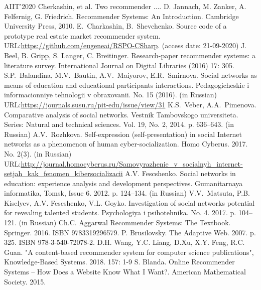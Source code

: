 \documentclass[conference,a4]{IEEEtran}
\begin{document}
\begin{thebibliography}{99}

 AIIT'2020 Cherkashin, et al. Two recommender ....
 D. Jannach, M. Zanker, A. Felfernig, G. Friedrich. Recommender Systems: An Introduction. Cambridge University Press, 2010.
E.~Charkashin, B.~Shevchenko. Source code of a prototype real estate market recommender system.  URL:\url{https://github.com/eugeneai/RSPO-CSharp}. (access date: 21-09-2020)
 J. Beel, B. Gripp, S. Langer, C. Breitinger. Research-paper recommender systems: a literature survey. International Journal on Digital Libraries (2016) 17: 305. 
S.P.~Balandina, M.V.~Bautin, A.V.~Maiyorov, E.R.~Smirnova. Social networks as means of education and educational participants interactions. Pedagogicheskie i informacionniye tehnologii v obraxovanii. No. 15 (2016). (in Russian) URL:\url{https://journals.susu.ru/pit-edu/issue/view/31}
K.S.~Veber, A.A.~Pimenova. Comparative analysis of social networks. Vestnik Tambovskogo universiteta. Series: Natural and technical sciences. Vol. 19, No. 2, 2014. p. 636--643. (in Russian)
A.V.~Rozhkova. Self-expression (self-presentation) in social Internet networks as a phenomenon of human cyber-socialization. Homo Cyberus. 2017. No. 2(3). (in Russian) URL:\url{http://journal.homocyberus.ru/Samovyrazhenie_v_socialnyh_internet-setjah_kak_fenomen_kibersocializacii}
 A.V. Fescshenko. Social networks in education: experience analysis and development perspectives. Gumanitarnaya informatika, Tomsk, Issue 6. 2012. p. 124--134. (in Russian)
V.V.~Matsuta, P.B. Kiselyev, A.V. Fescshenko, V.L. Goyko. Investigation of social networks potential for revealing talented students. Psychologiya i psihotehnika. No. 4. 2017. p. 104--121. (in Russian)
Ch.C. Aggarwal Recommender Systems: The Textbook. Springer. 2016. ISBN 9783319296579.
P. Brusilovsky. The Adaptive Web. 2007. p. 325. ISBN 978-3-540-72078-2.
D.H. Wang, Y.C. Liang, D.Xu, X.Y. Feng, R.C. Guan. "A content-based recommender system for computer science publications", Knowledge-Based Systems. 2018. 157: 1-9
S. Blanda. Online Recommender Systems – How Does a Website Know What I Want?. American Mathematical Society. 2015.

\end{thebibliography}
\end{document}
